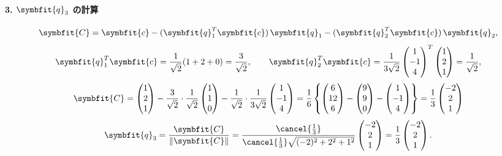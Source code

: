     \paragraph{3. $\symbfit{q}_3$ の計算}
    \[
        \symbfit{C} = \symbfit{c} - (\symbfit{q}_1^T \symbfit{c})\,\symbfit{q}_1 - (\symbfit{q}_2^T \symbfit{c})\,\symbfit{q}_2,
    \]
    \[
        \symbfit{q}_1^T \symbfit{c} = \frac{1}{\sqrt2}(1+2+0)=\frac{3}{\sqrt2},\qquad
        \symbfit{q}_2^T \symbfit{c}
        = \frac{1}{3\sqrt{2}} \begin{pmatrix}1\\-1\\4\end{pmatrix}^T
        \begin{pmatrix}1\\2\\1\end{pmatrix}
        = \frac{1}{\sqrt2},
    \]
    \[
        \symbfit{C}
        = \begin{pmatrix}1\\2\\1\end{pmatrix}
        - \frac{3}{\sqrt2}\cdot\frac{1}{\sqrt2}\begin{pmatrix}1\\1\\0\end{pmatrix}
        - \frac{1}{\sqrt2}\cdot\frac{1}{3\sqrt{2}}\begin{pmatrix}1\\-1\\4\end{pmatrix}
        = \frac{1}{6}\left\{
            \begin{pmatrix} 6 \\ 12 \\ 6 \end{pmatrix}
            - \begin{pmatrix} 9 \\ 9 \\ 0 \end{pmatrix}
            - \begin{pmatrix} 1 \\ -1 \\ 4 \end{pmatrix}
            \right\}
        = \frac{1}{3}\begin{pmatrix} -2 \\ 2 \\ 1 \end{pmatrix}
    \]
    \[
        \symbfit{q}_3
        = \frac{\symbfit{C}}{\|\symbfit{C}\|}
        = \frac{\cancel{\frac{1}{3}}}{\cancel{\frac{1}{3}}\sqrt{(-2)^2+2^2+1^2}}\begin{pmatrix} -2 \\ 2 \\1 \end{pmatrix}
        = \frac{1}{3}\begin{pmatrix} -2 \\ 2 \\1 \end{pmatrix}.
    \]
